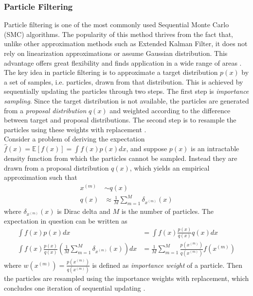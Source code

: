 \subsubsection{Particle Filtering}
Particle filtering is one of the most commonly used Sequential Monte Carlo (SMC) algorithms. The popularity of this method thrives from the fact that, unlike other approximation methods such as Extended Kalman Filter, it does not rely on linearization approximations or assume Gaussian distribution. This advantage offers great flexibility and finds application in a wide range of areas \cite{Doucet2009}. \\
The key idea in particle filtering is to approximate a target distribution $ p(x) $ by a set of samples, i.e. particles, drawn from that distribution. This is achieved by sequentially updating the particles through two steps. The first step is \textit{importance sampling}. Since the target distribution is not available, the particles are generated from a \textit{proposal distribution} $ q(x) $ and weighted according to the difference between target and proposal distributions. The second step is to resample the particles using these weights with replacement \cite{Godsill2019}. \\
Consider a problem of deriving the expectation $ \hat{f}(x) = \mathbb{E} \left[ f(x)\right] = \int f(x) p(x)dx $, and suppose $ p(x) $ is an intractable density function from which the particles cannot be sampled. Instead they are drawn from a proposal distribution $ q(x) $, which yields an empirical approximation such that
\begin{align*}
x^{(m)} & \sim q(x) \\
q(x) & \approx \frac{1}{M} \sum_{m=1}^{M} \delta_{x^{(m)}}(x)
\end{align*}
where $ \delta_{x^{(m)}}(x) $ is Dirac delta and $ M $ is the number of particles. The expectation in question can be written as
\begin{align*}
\int f(x) p(x)dx & = \int f(x) \frac{p(x)}{q(x)} q(x)dx\\
\int f(x) \frac{p(x)}{q(x)} \left( \frac{1}{M} \sum_{m=1}^{M} \delta_{x^{(m)}}(x)\right) dx & = \frac{1}{M} \sum_{m=1}^{M}\frac{p(x^{(m)})}{q(x^{(m)})} f(x^{(m)})
\end{align*}
where $ w(x^{(m)}) = \frac{p(x^{(m)})}{q(x^{(m)})} $ is defined as \textit{importance weight} of a particle. Then the particles are resampled using the importance weights with replacement, which concludes one iteration of sequential updating \cite{Godsill2019}.


